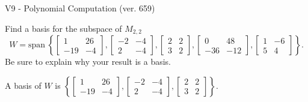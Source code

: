 \begin{exercise}
  \begin{exerciseTitle}V9 - Polynomial Computation (ver. 659)\end{exerciseTitle}
  \begin{exerciseStatement}
    Find a basis for the subspace of \(M_{2,2}\) 
\[W=\mathrm{span}\ \left\{\left[\begin{array}{cc}
1 & 26 \\
-19 & -4
\end{array}\right] , \left[\begin{array}{cc}
-2 & -4 \\
2 & -4
\end{array}\right] , \left[\begin{array}{cc}
2 & 2 \\
3 & 2
\end{array}\right] , \left[\begin{array}{cc}
0 & 48 \\
-36 & -12
\end{array}\right] , \left[\begin{array}{cc}
1 & -6 \\
5 & 4
\end{array}\right]\right\}.\]
 Be sure to explain why your result is a basis.


  \end{exerciseStatement}
  \begin{exerciseAnswer}
   A basis of \(W\) is  \(\left\{\left[\begin{array}{cc}
1 & 26 \\
-19 & -4
\end{array}\right] , \left[\begin{array}{cc}
-2 & -4 \\
2 & -4
\end{array}\right] , \left[\begin{array}{cc}
2 & 2 \\
3 & 2
\end{array}\right]\right\}\).
  


  \end{exerciseAnswer}
\end{exercise}
